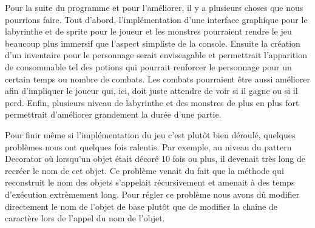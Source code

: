 \documentclass[a4paper]{article}
\begin{document}
Pour la suite du programme et pour l'améliorer, il y a plusieurs choses que nous pourrions faire.
Tout d'abord, l'implémentation d'une interface graphique pour le labyrinthe et de sprite pour le joueur et les monstres pourraient rendre le jeu beaucoup plus immersif
que l'aspect simpliste de la console. Ensuite la création d'un inventaire pour le personnage serait enviseagable et permettrait l'apparition de consommable tel des potions
qui pourrait renforcer le personnage pour un certain temps ou nombre de combats.
Les combats pourraient être aussi améliorer afin d'impliquer le joueur qui, ici, doit juste attendre de voir si il gagne ou si il perd.
Enfin, plusieurs niveau de labyrinthe et des monstres de plus en plus fort permettrait d'améliorer grandement la durée d'une partie.

Pour finir même si l'implémentation du jeu c'est plutôt bien déroulé, quelques problèmes nous ont quelques fois ralentis. Par exemple, au niveau du pattern Decorator
où lorsqu'un objet était décoré 10 fois ou plus, il devenait très long de recréer le nom de cet objet. Ce problème venait du fait que la méthode qui reconstruit le nom
des objets s'appelait récursivement et amenait à des temps d'exécution extrèmement long. Pour régler ce problème nous avons dû modifier directement le nom de l'objet de
base plutôt que de modifier la chaîne de caractère lors de l'appel du nom de l'objet.
\end{document}
